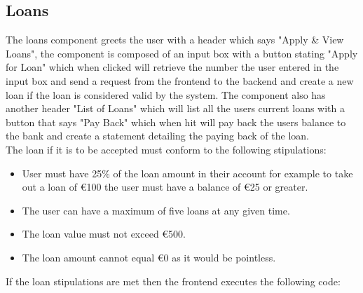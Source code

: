 \subsection{Loans}
The loans component greets the user with a header which says "Apply \& View Loans", the component is composed of
an input box with a button stating "Apply for Loan" which when clicked will retrieve the number the user entered
in the input box and send a request from the frontend to the backend and create a new loan if the loan is considered
valid by the system.  The component also has another header "List of Loans" which will list all the users current loans
with a button that says "Pay Back" which when hit will pay back the users balance to the bank and create a statement detailing
the paying back of the loan.
\\
The loan if it is to be accepted must conform to the following stipulations:
\begin{itemize}
  \item User must have 25\% of the loan amount in their account for example to take out a loan of €100 the user must have a balance of €25 or greater.
  \item The user can have a maximum of five loans at any given time.
  \item The loan value must not exceed €500.
  \item The loan amount cannot equal €0 as it would be pointless.
\end{itemize}
If the loan stipulations are met then the frontend executes the following code:
